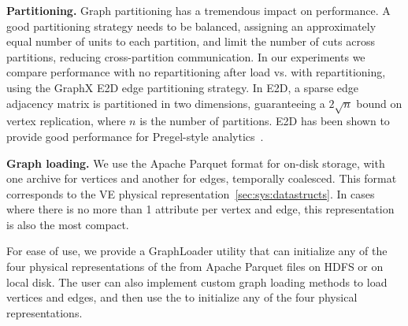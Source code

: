 {\bf Partitioning.}  Graph partitioning has a tremendous impact on
performance.  A good partitioning strategy needs to be balanced,
assigning an approximately equal number of units to each partition,
and limit the number of cuts across partitions, reducing
cross-partition communication.  In our experiments we compare
performance with no repartitioning after load vs.  with
repartitioning, using the GraphX E2D edge partitioning strategy.  In
E2D, a sparse edge adjacency matrix is partitioned in two dimensions,
guaranteeing a $2 \sqrt{n}$ bound on vertex replication, where $n$ is
the number of partitions. E2D has been shown to provide good
performance for Pregel-style
analytics~\cite{DBLP:conf/osdi/GonzalezXDCFS14,MoffittTempWeb16}.

{\bf Graph loading.}  We use the Apache Parquet format for on-disk
storage, with one archive for vertices and another for edges,
temporally coalesced.  This format corresponds to the VE physical
representation~\ref{sec:sys:datastructs}.  In cases where there is no
more than 1 attribute per vertex and edge, this representation is also
the most compact.  

For ease of use, we provide a GraphLoader utility that can initialize
any of the four physical representations of the \tg from Apache
Parquet files on HDFS or on local disk.  The \ql user can also
implement custom graph loading methods to load vertices and edges, and
then use the  to initialize any of the four physical
representations.





